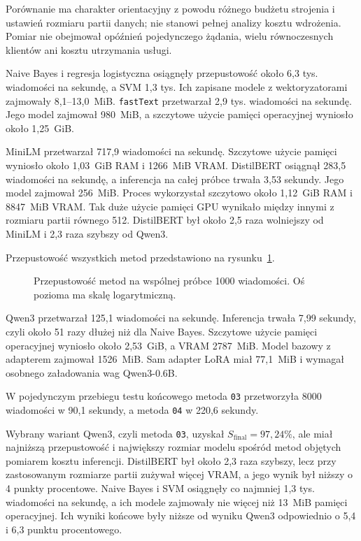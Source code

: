 Porównanie ma charakter orientacyjny z powodu różnego budżetu strojenia i
ustawień rozmiaru partii danych; nie stanowi pełnej analizy kosztu wdrożenia.
Pomiar nie obejmował opóźnień pojedynczego żądania, wielu równoczesnych klientów
ani kosztu utrzymania usługi.

\begin{table}[htbp]
\centering
\scriptsize
\resizebox{\textwidth}{!}{}
\caption{Mediana kosztu inferencji na wspólnej próbce 1000 wiadomości.}
\label{tab:sota-inference-costs}
\end{table}

Naive Bayes i regresja logistyczna osiągnęły przepustowość około 6,3 tys.
wiadomości na sekundę, a SVM 1,3 tys. Ich zapisane modele z wektoryzatorami
zajmowały 8,1--13,0~MiB. \texttt{fastText} przetwarzał 2,9 tys. wiadomości na
sekundę. Jego model zajmował 980~MiB, a szczytowe użycie pamięci operacyjnej
wyniosło około 1,25~GiB.

MiniLM przetwarzał 717,9 wiadomości na sekundę. Szczytowe użycie pamięci
wyniosło około 1,03~GiB RAM i 1266~MiB VRAM. DistilBERT osiągnął 283,5
wiadomości na sekundę, a inferencja na całej próbce trwała 3,53 sekundy. Jego
model zajmował 256~MiB. Proces wykorzystał szczytowo około 1,12~GiB RAM i
8847~MiB VRAM. Tak duże użycie pamięci GPU wynikało między innymi z rozmiaru
partii równego 512. DistilBERT był około 2,5 raza wolniejszy od MiniLM i 2,3
raza szybszy od Qwen3.

Przepustowość wszystkich metod przedstawiono na
rysunku~\ref{fig:sota-inference-throughput}.

\begin{figure}[htbp]
\centering

\caption{Przepustowość metod na wspólnej próbce 1000 wiadomości. Oś pozioma ma
skalę logarytmiczną.}
\label{fig:sota-inference-throughput}
\end{figure}

Qwen3 przetwarzał 125,1 wiadomości na sekundę. Inferencja trwała 7,99 sekundy,
czyli około 51 razy dłużej niż dla Naive Bayes. Szczytowe użycie pamięci
operacyjnej wyniosło około 2,53~GiB, a VRAM 2787~MiB. Model bazowy z adapterem
zajmował 1526~MiB. Sam adapter LoRA miał 77,1~MiB i wymagał osobnego
załadowania wag Qwen3-0.6B.

W pojedynczym przebiegu testu końcowego metoda \texttt{03} przetworzyła 8000
wiadomości w 90,1 sekundy, a metoda \texttt{04} w 220,6 sekundy.

Wybrany wariant Qwen3, czyli metoda \texttt{03}, uzyskał
\(S_{\mathrm{final}}=97{,}24\%\), ale miał najniższą przepustowość i największy
rozmiar modelu spośród metod objętych pomiarem kosztu inferencji. DistilBERT był
około 2,3 raza szybszy, lecz przy zastosowanym rozmiarze partii zużywał więcej
VRAM, a jego wynik był niższy o 4 punkty procentowe. Naive Bayes i SVM osiągnęły co najmniej 1,3 tys.
wiadomości na sekundę, a ich modele zajmowały nie więcej niż 13~MiB pamięci operacyjnej. Ich wyniki
końcowe były niższe od wyniku Qwen3 odpowiednio o 5,4 i 6,3 punktu
procentowego.
